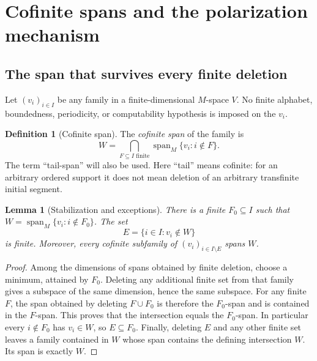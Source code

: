 \documentclass[11pt,a4paper]{article}
\numberwithin{equation}{section}
\newtheorem{lemma}[theorem]{Lemma}
\theoremstyle{definition}
\newtheorem{definition}[theorem]{Definition}
\theoremstyle{remark}
\newcommand{\Span}{\operatorname{span}}
\begin{document}
\section{Cofinite spans and the polarization mechanism}\label{tail:sec:mechanism}

\subsection{The span that survives every finite deletion}
Let $(v_i)_{i\in I}$ be any family in a finite-dimensional $M$-space $V$.
No finite alphabet, boundedness, periodicity, or computability hypothesis
is imposed on the $v_i$.

\begin{definition}[Cofinite span]
The \emph{cofinite span} of the family is
\[
 W=\bigcap_{F\subseteq I\text{ finite}}
             \Span_M\{v_i:i\notin F\}.
\]
The term ``tail-span'' will also be used. Here ``tail'' means cofinite:
for an arbitrary ordered support it does not mean deletion of an arbitrary
transfinite initial segment.
\end{definition}

\begin{lemma}[Stabilization and exceptions]\label{tail:lem:stabilization}
There is a finite $F_0\subseteq I$ such that
$W=\Span_M\{v_i:i\notin F_0\}$. The set
\[
 E=\{i\in I:v_i\notin W\}
\]
is finite. Moreover, every cofinite subfamily of $(v_i)_{i\in I\setminus E}$
spans $W$.
\end{lemma}
\begin{proof}
Among the dimensions of spans obtained by finite deletion, choose a
minimum, attained by $F_0$. Deleting any additional finite set from that
family gives a subspace of the same dimension, hence the same subspace.
For any finite $F$, the span obtained by deleting $F\cup F_0$ is therefore
the $F_0$-span and is contained in the $F$-span. This proves that the
intersection equals the $F_0$-span. In particular every $i\notin F_0$ has
$v_i\in W$, so $E\subseteq F_0$. Finally, deleting $E$ and any other finite
set leaves a family contained in $W$ whose span contains the defining
intersection $W$. Its span is exactly $W$.
\end{proof}
\end{document}
